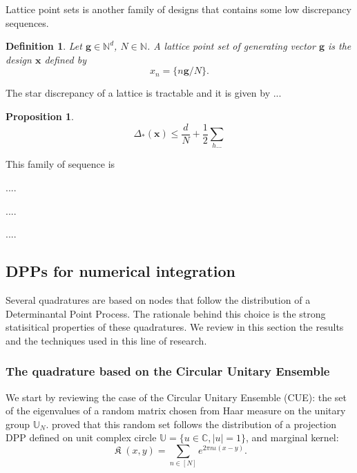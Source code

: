 \documentclass[twoside,11pt]{book}
\newtheorem{proposition}{Proposition}
\newtheorem{definition}{Definition}
\DeclareMathOperator*{\KDPP}{\mathfrak{K}}
\begin{document}
Lattice point sets is another family of designs that contains some low discrepancy sequences.

\begin{definition}
Let $\bm{g} \in \mathbb{N}^{d}$, $N \in \mathbb{N}$. A lattice point set of generating vector $\bm{g}$ is the design $\bm{x}$ defined by
\begin{equation}
x_{n} = \{ n\bm{g}/N \}.
\end{equation}
\end{definition}

The star discrepancy of a lattice is tractable and it is given by ...

\begin{proposition}
\begin{equation}
\Delta_{*}(\bm{x}) \leq \frac{d}{N} + \frac{1}{2} \sum\limits_{h ...}
\end{equation}
\end{proposition}

This family of sequence is 


....


....

....



\subsection{DPPs for numerical integration}
Several quadratures are based on nodes that follow the distribution of a Determinantal Point Process. The rationale behind this choice is the strong statisitical properties of these quadratures. We review in this section the results and the techniques used in this line of research. 

\subsubsection{The quadrature based on the Circular Unitary Ensemble}
We start by reviewing the case of the Circular Unitary Ensemble (CUE): the set of the eigenvalues of a random matrix chosen from Haar measure on the unitary group $\mathbb{U}_{N}$. \cite{Wey46} proved that this random set follows the distribution of a projection DPP defined on unit complex circle $\mathbb{U} = \{ u \in \mathbb{C}, |u| =1 \}$, and marginal kernel:
\begin{equation}
\KDPP(x,y) = \sum\limits_{n \in [N]} e^{2 \pi n \iota(x-y)}.
\end{equation}
\end{document}
